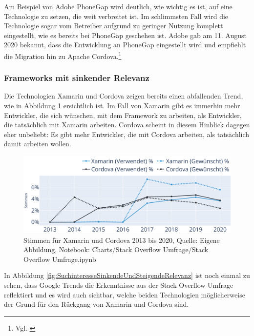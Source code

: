 Am Beispiel von Adobe PhoneGap wird deutlich, wie wichtig es ist, auf eine Technologie zu setzen, die weit verbreitet ist. Im schlimmsten Fall wird die Technologie sogar vom Betreiber aufgrund zu geringer Nutzung komplett eingestellt, wie es bereits bei PhoneGap geschehen ist. Adobe gab am 11. August 2020 bekannt, dass die  Entwicklung an PhoneGap eingestellt wird und empfiehlt die Migration hin zu Apache Cordova.\footnote{Vgl. \cite{UpdateForCustomersUsingPhoneGapAndPhoneGapBuild}}

\subsubsection{Frameworks mit sinkender Relevanz}

Die Technologien Xamarin und Cordova zeigen bereits einen abfallenden Trend, wie in Abbildung \ref{fig:XamarinUndCordovaStimmen} ersichtlich ist. Im Fall von Xamarin gibt es immerhin mehr Entwickler, die sich wünschen, mit dem Framework zu arbeiten, als Entwickler, die tatsächlich mit Xamarin arbeiten. Cordova scheint in diesem Hinblick dagegen eher unbeliebt: Es gibt mehr Entwickler, die mit Cordova arbeiten, als tatsächlich damit arbeiten wollen.

\begin{figure}[H]
	\centering
    \includegraphics[width=1.0\textwidth]{Charts/Stack Overflow Umfrage/Xamarin und Cordova Stimmen.pdf}
	\caption[Stimmen für Xamarin und Cordova]{Stimmen für Xamarin und Cordova 2013 bis 2020, Quelle: Eigene Abbildung, Notebook: Charts/Stack Overflow Umfrage/Stack Overflow Umfrage.ipynb}
	\label{fig:XamarinUndCordovaStimmen}
\end{figure}

In Abbildung \ref{fig:SuchinteresseSinkendeUndSteigendeRelevanz} ist noch einmal zu sehen, dass Google Trends die Erkenntnisse aus der Stack Overflow Umfrage reflektiert und es wird auch sichtbar, welche beiden Technologien möglicherweise der Grund für den Rückgang von Xamarin und Cordova sind.

